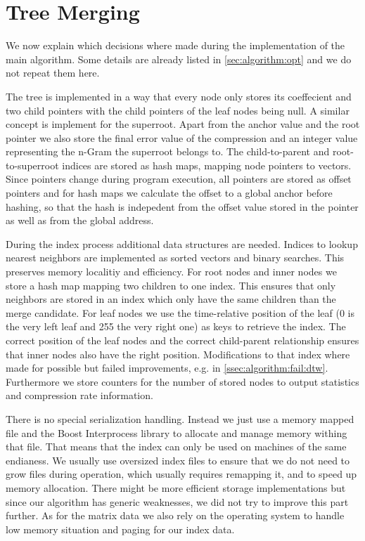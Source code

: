 \section{Tree Merging}
\label{sec:implementation:tree}

We now explain which decisions where made during the implementation of the main algorithm. Some details are already listed in \autoref{sec:algorithm:opt} and we do not repeat them here.

The tree is implemented in a way that every node only stores its coeffecient and two child pointers with the child pointers of the leaf nodes being null. A similar concept is implement for the superroot. Apart from the anchor value and the root pointer we also store the final error value of the compression and an integer value representing the n-Gram the superroot belongs to. The child-to-parent and root-to-superroot indices are stored as hash maps, mapping node pointers to vectors. Since pointers change during program execution, all pointers are stored as offset pointers and for hash maps we calculate the offset to a global anchor before hashing, so that the hash is indepedent from the offset value stored in the pointer as well as from the global address.

During the index process additional data structures are needed. Indices to lookup nearest neighbors are implemented as sorted vectors and binary searches. This preserves memory localitiy and efficiency. For root nodes and inner nodes we store a hash map mapping two children to one index. This ensures that only neighbors are stored in an index which only have the same children than the merge candidate. For leaf nodes we use the time-relative position of the leaf (\num{0} is the very left leaf and \num{255} the very right one) as keys to retrieve the index. The correct position of the leaf nodes and the correct child-parent relationship ensures that inner nodes also have the right position. Modifications to that index where made for possible but failed improvements, e.g. in \autoref{ssec:algorithm:fail:dtw}. Furthermore we store counters for the number of stored nodes to output statistics and compression rate information.

There is no special serialization handling. Instead we just use a memory mapped file and the Boost Interprocess library to allocate and manage memory withing that file. That means that the index can only be used on machines of the same endianess. We usually use oversized index files to ensure that we do not need to grow files during operation, which usually requires remapping it, and to speed up memory allocation. There might be more efficient storage implementations but since our algorithm has generic weaknesses, we did not try to improve this part further. As for the matrix data we also rely on the operating system to handle low memory situation and paging for our index data.

